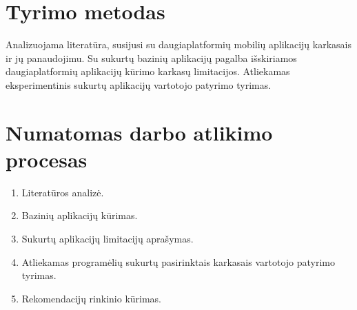 \documentclass{VUMIFInfBakalaurinis}
\begin{document}
\section{Tyrimo metodas}
Analizuojama literatūra, susijusi su daugiaplatformių mobilių aplikacijų karkasais ir jų panaudojimu.
Su sukurtų bazinių aplikacijų pagalba išskiriamos daugiaplatformių aplikacijų kūrimo karkasų limitacijos.
Atliekamas eksperimentinis sukurtų aplikacijų vartotojo patyrimo tyrimas.

\section{Numatomas darbo atlikimo procesas}
\begin{enumerate}
  \item Literatūros analizė.
  \item Bazinių aplikacijų kūrimas.
  \item Sukurtų aplikacijų limitacijų aprašymas.
  \item Atliekamas programėlių sukurtų pasirinktais karkasais vartotojo patyrimo tyrimas.
  \item Rekomendacijų rinkinio kūrimas.
\end{enumerate}

\printbibliography[heading=bibintoc] %
\end{document}
